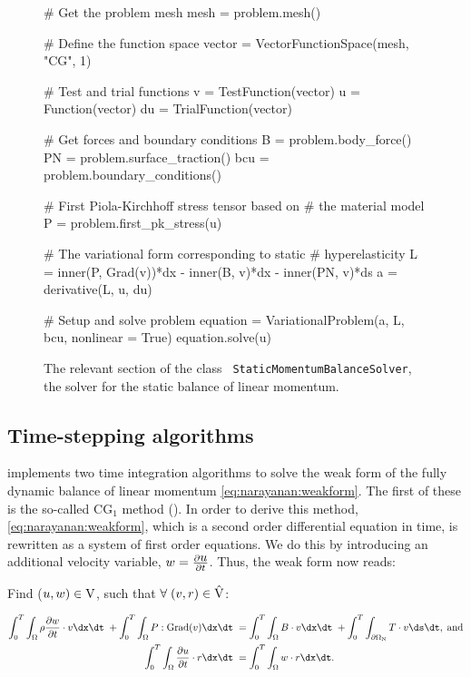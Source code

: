 \begin{figure}[ht]
\begin{python}
# Get the problem mesh
mesh = problem.mesh()

# Define the function space
vector = VectorFunctionSpace(mesh, "CG", 1)

# Test and trial functions
v = TestFunction(vector)
u = Function(vector)
du = TrialFunction(vector)

# Get forces and boundary conditions
B = problem.body_force()
PN = problem.surface_traction()
bcu = problem.boundary_conditions()

# First Piola-Kirchhoff stress tensor based on
# the material model
P = problem.first_pk_stress(u)

# The variational form corresponding to static
# hyperelasticity
L = inner(P, Grad(v))*dx - inner(B, v)*dx - inner(PN, v)*ds
a = derivative(L, u, du)

# Setup and solve problem
equation = VariationalProblem(a, L, bcu,
                              nonlinear = True)
equation.solve(u)
\end{python}
\caption{The relevant section of the class {\tt
    StaticMomentumBalanceSolver}, the solver for the static balance of
  linear momentum.}
\label{code:narayanan:staticmomentumsolver}
\end{figure}

\subsection{Time-stepping algorithms}

\twist{} implements two time integration algorithms to solve the weak
form of the fully dynamic balance of linear momentum
\eqref{eq:narayanan:weakform}. The first of these is the
so-called CG$_{1}$ method (\cite{ErikssonEstepHansboEtAl1996}). In order
to derive this method, \eqref{eq:narayanan:weakform}, which is
a second order differential equation in time, is rewritten as a system
of first order equations. We do this by introducing an additional
velocity variable, $\mbox{$ w$} = \frac{\partial \mbox{$ u$}}{\partial t}$. Thus, the
weak form now reads:

\noindent Find ($\mbox{$ u$}, \mbox{$ w$}) \in \mathrm{V}$, such that $\forall\; (\mbox{$ v$},
\mbox{$ r$}) \in \hat{\mathrm{V}}$:

\begin{equation}
\begin{split}
  \int_{0}^{T} \int_{\Omega} \rho \frac{\partial \bw}{\partial t}
\cdot \bv \dx \dt\; + \int_{0}^{T} \int_{\Omega}
\bP:\mathrm{Grad}(\bv) \dx \dt\; &= \int_{0}^{T} \int_{\Omega} \bB
\cdot \bv \dx \dt\; + \int_{0}^{T} \int_{\partial\Omega_{\mathrm{N}}}
\bT \cdot \bv \ds \dt, \; \mathrm{and}\\ \int_{0}^{T} \int_{\Omega}
\frac{\partial \bu}{\partial t} \cdot \br \dx \dt\; &= \int_{0}^{T}
\int_{\Omega} \bw \cdot \br \dx \dt.
\end{split}
\label{eq:narayanan:cg1weakform}
\end{equation}

